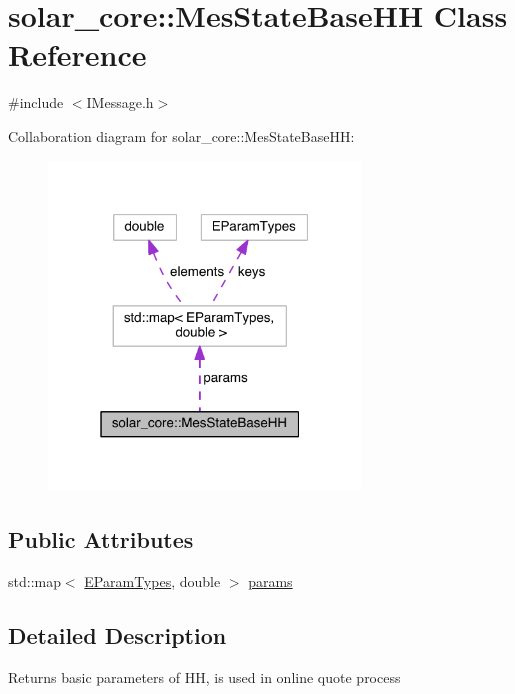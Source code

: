 \hypertarget{classsolar__core_1_1_mes_state_base_h_h}{}\section{solar\+\_\+core\+:\+:Mes\+State\+Base\+H\+H Class Reference}
\label{classsolar__core_1_1_mes_state_base_h_h}


{\ttfamily \#include $<$I\+Message.\+h$>$}



Collaboration diagram for solar\+\_\+core\+:\+:Mes\+State\+Base\+H\+H\+:
\nopagebreak
\begin{figure}[H]
\begin{center}
\leavevmode
\includegraphics[width=235pt]{classsolar__core_1_1_mes_state_base_h_h__coll__graph}
\end{center}
\end{figure}
\subsection*{Public Attributes}
\begin{DoxyCompactItemize}
\item 
std\+::map$<$ \hyperlink{namespacesolar__core_aa1147341e5ef7a40d68d1bd68e149362}{E\+Param\+Types}, double $>$ \hyperlink{classsolar__core_1_1_mes_state_base_h_h_a75575469dfbf7a86bd1ea95fb85c5194}{params}
\end{DoxyCompactItemize}


\subsection{Detailed Description}
Returns basic parameters of H\+H, is used in online quote process

